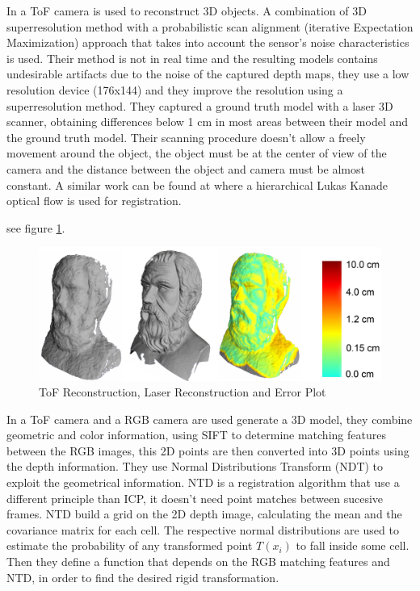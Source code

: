 In \cite{cui} a ToF camera is used to reconstruct 3D objects. A combination of 3D superresolution method with a 
probabilistic scan alignment (iterative Expectation Maximization) approach that takes into account the sensor's 
noise characteristics is used. Their method is not in real time and the resulting models contains undesirable 
artifacts due to  the noise of the captured depth maps, they use a low resolution device (176x144) and they 
improve the resolution using a superresolution method. They captured a ground truth model with a laser 3D scanner, 
obtaining differences below 1 cm in most areas between their model and the ground truth model. Their scanning 
procedure doesn't allow a freely movement around the object, the object must be at the center of view of the camera 
and the distance between the object and camera must be almost constant. A similar work can be found at \cite{schoun} where 
 a hierarchical Lukas Kanade optical flow is used for registration.
 
see figure \ref{fig:cui}.

\begin{figure}[h!]
\begin{center}
\includegraphics[scale=0.23]{images/cui}
\caption{ToF Reconstruction, Laser Reconstruction and Error Plot}
\label{fig:cui}
\end{center}
\end{figure}

In \cite{huhle} a ToF camera and a RGB camera are used generate a 3D model, they combine geometric and color information, 
using SIFT to determine matching features between the RGB images, 
this 2D points are then converted into 3D points using the depth information. They use  Normal Distributions Transform (NDT) \cite{biber03} to exploit the geometrical 
information. NTD is a registration algorithm that use a different principle than ICP, it doesn't need point matches 
between sucesive frames. NTD build a grid on the 2D depth image, calculating the mean and the covariance matrix for each 
 cell. The respective normal distributions are used to estimate the probability of any transformed point $T(x_i)$ to fall 
inside some cell. Then they define a function that depends on the RGB matching features and NTD, in order to find the desired 
rigid transformation.

